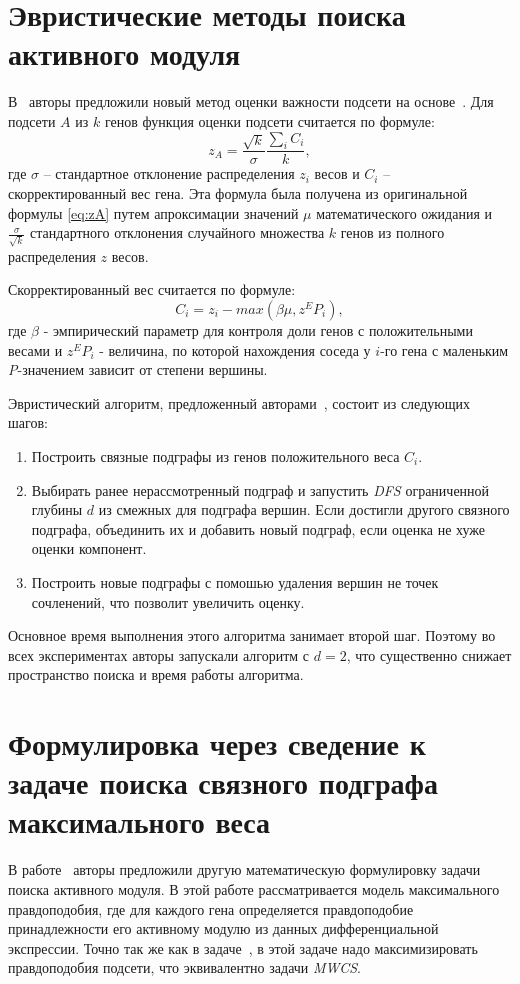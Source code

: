 \section{Эвристические методы поиска активного модуля}

В~\cite{Rajagopalan2005} авторы предложили новый метод оценки важности подсети
на основе~\cite{Ideker2002}.  Для подсети $A$ из $k$ генов функция оценки
подсети считается по формуле:
\[z_A = \frac{\sqrt{k}}{\sigma} \frac{\sum_{i}{C_i}}{k},\]
где $\sigma$ -- стандартное отклонение распределения $z_i$ весов и $C_i$
-- скорректированный вес гена.  Эта формула была получена из оригинальной
формулы \eqref{eq:zA} путем апроксимации значений $\mu$ математического
ожидания и $\frac{\sigma}{\sqrt{k}}$ стандартного отклонения случайного
множества $k$ генов из полного распределения $z$ весов.

Скорректированный вес считается по формуле:
\[C_i = z_i - max(\beta \mu, z^EP_i),\]
где $\beta$ - эмпирический параметр для контроля доли генов с положительными
весами и $z^EP_i$ - величина, по которой нахождения соседа у $i$-го гена
с маленьким \emph{P}-значением зависит от степени вершины.

Эвристический алгоритм, предложенный авторами~\cite{Rajagopalan2005}, состоит из
следующих шагов:
\begin{enumerate}
    \item Построить связные подграфы из генов положительного веса $C_i.$
    \item Выбирать ранее нерассмотренный подграф и запустить \emph{DFS}
        ограниченной глубины $d$ из смежных для подграфа вершин. Если
        достигли другого связного подграфа, объединить их и добавить новый
        подграф, если оценка не хуже оценки компонент.
    \item Построить новые подграфы с помошью удаления вершин не точек
        сочленений, что позволит увеличить оценку.
\end{enumerate}

Основное время выполнения этого алгоритма занимает второй шаг. Поэтому во всех
экспериментах авторы запускали алгоритм с $d=2$, что существенно снижает
пространство поиска и время работы алгоритма.





\section{Формулировка через сведение к задаче поиска связного подграфа
максимального веса}
В работе~\cite{Dittrich2008a,Beisser2010} авторы предложили другую
математическую формулировку задачи поиска активного модуля.  В этой работе
рассматривается модель максимального правдоподобия, где для каждого гена
определяется правдоподобие принадлежности его активному модулю из данных
дифференциальной экспрессии.  Точно так же как в задаче~\cite{Ideker2002},
в этой задаче надо максимизировать правдоподобия подсети, что эквивалентно
задачи \emph{MWCS}.

